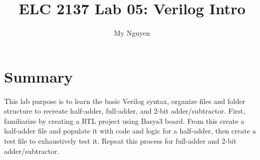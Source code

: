 \documentclass[11pt]{article}
\begin{document}
\title{ELC 2137 Lab 05: Verilog Intro}
\author{My Nguyen}

\maketitle

\section*{Summary}
This lab purpose is to learn the basic Verilog syntax, organize files and folder structure to recreate half-adder, full-adder, and 2-bit adder/subtractor. First, familiarize by creating a RTL project using Basys3 board. From this create a half-adder file and populate it with code and logic for a half-adder, then create a test file to exhaustively test it. Repeat this process for full-adder and 2-bit adder/subtractor. 
\end{document}
